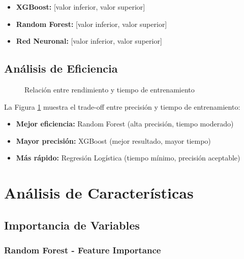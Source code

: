 \begin{itemize}
    \item \textbf{XGBoost:} [valor inferior, valor superior]
    \item \textbf{Random Forest:} [valor inferior, valor superior]
    \item \textbf{Red Neuronal:} [valor inferior, valor superior]
\end{itemize}

\subsection{Análisis de Eficiencia}

\begin{figure}[htbp]
\centering
\caption{Relación entre rendimiento y tiempo de entrenamiento}
\label{fig:rendimiento_tiempo}
\end{figure}

La Figura \ref{fig:rendimiento_tiempo} muestra el trade-off entre precisión y tiempo de entrenamiento:

\begin{itemize}
    \item \textbf{Mejor eficiencia:} Random Forest (alta precisión, tiempo moderado)
    \item \textbf{Mayor precisión:} XGBoost (mejor resultado, mayor tiempo)
    \item \textbf{Más rápido:} Regresión Logística (tiempo mínimo, precisión aceptable)
\end{itemize}

\section{Análisis de Características}

\subsection{Importancia de Variables}

\subsubsection{Random Forest - Feature Importance}

